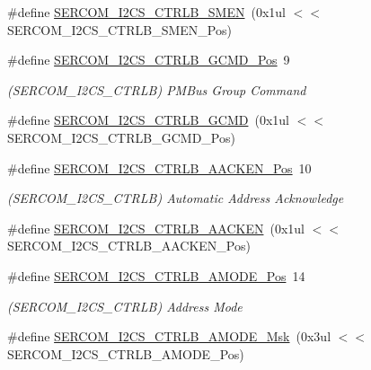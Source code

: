 \begin{DoxyCompactItemize}
\#define \mbox{\hyperlink{group___s_a_m_d21___s_e_r_c_o_m_ga863efdeb59ad93c1c572239e7ae43ae2}{S\+E\+R\+C\+O\+M\+\_\+\+I2\+C\+S\+\_\+\+C\+T\+R\+L\+B\+\_\+\+S\+M\+EN}}~(0x1ul $<$$<$ S\+E\+R\+C\+O\+M\+\_\+\+I2\+C\+S\+\_\+\+C\+T\+R\+L\+B\+\_\+\+S\+M\+E\+N\+\_\+\+Pos)
\item 
\#define \mbox{\hyperlink{group___s_a_m_d21___s_e_r_c_o_m_gaecd606c38c836f759f83da88507a4aec}{S\+E\+R\+C\+O\+M\+\_\+\+I2\+C\+S\+\_\+\+C\+T\+R\+L\+B\+\_\+\+G\+C\+M\+D\+\_\+\+Pos}}~9
\begin{DoxyCompactList}\small\item\em (S\+E\+R\+C\+O\+M\+\_\+\+I2\+C\+S\+\_\+\+C\+T\+R\+LB) P\+M\+Bus Group Command \end{DoxyCompactList}\item 
\#define \mbox{\hyperlink{group___s_a_m_d21___s_e_r_c_o_m_ga8c1a178389cb00286fc9913d1663f6ae}{S\+E\+R\+C\+O\+M\+\_\+\+I2\+C\+S\+\_\+\+C\+T\+R\+L\+B\+\_\+\+G\+C\+MD}}~(0x1ul $<$$<$ S\+E\+R\+C\+O\+M\+\_\+\+I2\+C\+S\+\_\+\+C\+T\+R\+L\+B\+\_\+\+G\+C\+M\+D\+\_\+\+Pos)
\item 
\#define \mbox{\hyperlink{group___s_a_m_d21___s_e_r_c_o_m_gadcca259920f7bfbf8b1ba71344524aa8}{S\+E\+R\+C\+O\+M\+\_\+\+I2\+C\+S\+\_\+\+C\+T\+R\+L\+B\+\_\+\+A\+A\+C\+K\+E\+N\+\_\+\+Pos}}~10
\begin{DoxyCompactList}\small\item\em (S\+E\+R\+C\+O\+M\+\_\+\+I2\+C\+S\+\_\+\+C\+T\+R\+LB) Automatic Address Acknowledge \end{DoxyCompactList}\item 
\#define \mbox{\hyperlink{group___s_a_m_d21___s_e_r_c_o_m_ga1a1d0f42bce4238421bd6cd04d0e8704}{S\+E\+R\+C\+O\+M\+\_\+\+I2\+C\+S\+\_\+\+C\+T\+R\+L\+B\+\_\+\+A\+A\+C\+K\+EN}}~(0x1ul $<$$<$ S\+E\+R\+C\+O\+M\+\_\+\+I2\+C\+S\+\_\+\+C\+T\+R\+L\+B\+\_\+\+A\+A\+C\+K\+E\+N\+\_\+\+Pos)
\item 
\#define \mbox{\hyperlink{group___s_a_m_d21___s_e_r_c_o_m_ga3a2e9eb3ba2460c2e89a056f56b5e0d4}{S\+E\+R\+C\+O\+M\+\_\+\+I2\+C\+S\+\_\+\+C\+T\+R\+L\+B\+\_\+\+A\+M\+O\+D\+E\+\_\+\+Pos}}~14
\begin{DoxyCompactList}\small\item\em (S\+E\+R\+C\+O\+M\+\_\+\+I2\+C\+S\+\_\+\+C\+T\+R\+LB) Address Mode \end{DoxyCompactList}\item 
\#define \mbox{\hyperlink{group___s_a_m_d21___s_e_r_c_o_m_ga9154dde04914e1c9f121674eb49306eb}{S\+E\+R\+C\+O\+M\+\_\+\+I2\+C\+S\+\_\+\+C\+T\+R\+L\+B\+\_\+\+A\+M\+O\+D\+E\+\_\+\+Msk}}~(0x3ul $<$$<$ S\+E\+R\+C\+O\+M\+\_\+\+I2\+C\+S\+\_\+\+C\+T\+R\+L\+B\+\_\+\+A\+M\+O\+D\+E\+\_\+\+Pos)

\end{DoxyCompactItemize}
